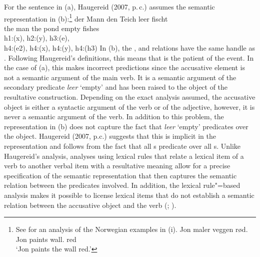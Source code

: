 \begin{exe}
\begin{xlist}[iv.]
\begin{exe}
\begin{xlist}[iv.]
For the sentence in (a), Haugereid (2007, p.\,c.) assumes the semantic representation in (b):\footnote{
  See  for an analysis of the Norwegian examples in (i).
\ea
\gll Jon maler veggen rød.\\
     Jon paints wall. red\\
\glt `Jon paints the wall red.'
\zlast
}
\eal
\ex 
\gll der Mann den Teich leer fischt\\
	 the man the pond empty fishes\\
\ex h1:(x), h2:(y), h3:(e),\\
    h4:(e2), h4:(x), h4:(y), h4:(h3)
\zl
In (b), the ,  and  relations have the same handle as . 
Following Haugereid's definitions, this means that  is the patient of the event. In the case of
(a), this makes incorrect predictions since the accusative element is not a semantic argument of the main
verb. It is a semantic argument of the secondary predicate \emph{leer} `empty' and has been raised to the object
of the resultative construction. Depending on the exact analysis assumed, the accusative object is either a syntactic
argument of the verb or of the adjective, however, it is never a semantic argument of the verb. In addition to this problem,
the representation in (b) does not capture the fact that \emph{leer} `empty' predicates over the object. Haugereid (2007, p.c.) suggests
that this is implicit in the representation and follows from the fact that all s predicate over all s.
Unlike Haugereid's analysis, analyses using lexical rules that relate a lexical item of a verb to
another verbal item with a resultative meaning allow for a precise specification of the semantic representation
that then captures the semantic relation between the predicates involved. In addition, the lexical
rule"=based analysis makes it possible to license lexical items  that do not establish a semantic relation between the accusative object and the verb
(\citealp{Wechsler97a,WN2001a};
\citealp[Chapter~5]{Mueller2002b}).


\end{xlist}
\end{exe}
\end{xlist}
\end{exe}
